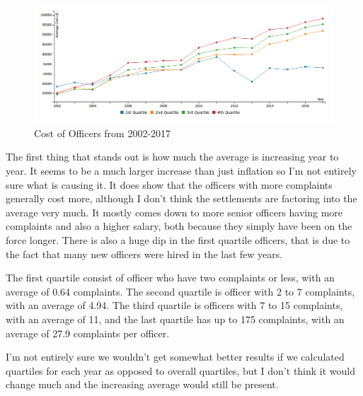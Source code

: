 \documentclass[11pt]{article}
\begin{document}
\begin{figure}[h]
\caption{Cost of Officers from 2002-2017}
\includegraphics[width=\textwidth]{costline.png}
\end{figure}

The first thing that stands out is how much the average is increasing year to year. It seems to be a much larger increase than just inflation so I'm not entirely sure what is causing it. It does show that the officers with more complaints generally cost more, although I don't think the settlements are factoring into the average very much. It mostly comes down to more senior officers having more complaints and also a higher salary, both because they simply have been on the force longer. There is also a huge dip in the first quartile officers, that is due to the fact that many new officers were hired in the last few years.

The first quartile consist of officer who have two complaints or less, with an average of 0.64 complaints. The second quartile is officer with 2 to 7 complaints, with an average of 4.94. The third quartile is officers with 7 to 15 complaints, with an average of 11, and the last quartile has up to 175 complaints, with an average of 27.9 complaints per officer.

I'm not entirely sure we wouldn't get somewhat better results if we calculated quartiles for each year as opposed to overall quartiles, but I don't think it would change much and the increasing average would still be present.
\end{document}
